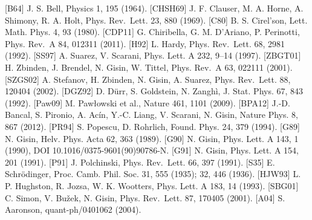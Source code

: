 \documentclass[
  11pt]{article}
\begin{document}
{[}B64{]} J. S. Bell, Physics 1, 195 (1964). {[}CHSH69{]} J. F. Clauser,
M. A. Horne, A. Shimony, R. A. Holt, Phys. Rev.~Lett. 23, 880 (1969).
{[}C80{]} B. S. Cirel'son, Lett. Math. Phys. 4, 93 (1980). {[}CDP11{]}
G. Chiribella, G. M. D'Ariano, P. Perinotti, Phys. Rev.~A 84, 012311
(2011). {[}H92{]} L. Hardy, Phys. Rev.~Lett. 68, 2981 (1992). {[}SS97{]}
A. Suarez, V. Scarani, Phys. Lett. A 232, 9--14 (1997). {[}ZBGT01{]} H.
Zbinden, J. Brendel, N. Gisin, W. Tittel, Phys. Rev.~A 63, 022111
(2001). {[}SZGS02{]} A. Stefanov, H. Zbinden, N. Gisin, A. Suarez, Phys.
Rev.~Lett. 88, 120404 (2002). {[}DGZ92{]} D. Dürr, S. Goldstein, N.
Zanghì, J. Stat. Phys. 67, 843 (1992). {[}Paw09{]} M. Pawłowski et al.,
Nature 461, 1101 (2009). {[}BPA12{]} J.-D. Bancal, S. Pironio, A. Acín,
Y.-C. Liang, V. Scarani, N. Gisin, Nature Phys. 8, 867 (2012).
{[}PR94{]} S. Popescu, D. Rohrlich, Found. Phys. 24, 379 (1994).
{[}G89{]} N. Gisin, Helv. Phys. Acta 62, 363 (1989). {[}G90{]} N. Gisin,
Phys. Lett. A 143, 1 (1990), DOI 10.1016/0375-9601(90)90786-N. {[}G91{]}
N. Gisin, Phys. Lett. A 154, 201 (1991). {[}P91{]} J. Polchinski, Phys.
Rev.~Lett. 66, 397 (1991). {[}S35{]} E. Schrödinger, Proc. Camb. Phil.
Soc. 31, 555 (1935); 32, 446 (1936). {[}HJW93{]} L. P. Hughston, R.
Jozsa, W. K. Wootters, Phys. Lett. A 183, 14 (1993). {[}SBG01{]} C.
Simon, V. Bužek, N. Gisin, Phys. Rev.~Lett. 87, 170405 (2001). {[}A04{]}
S. Aaronson, quant-ph/0401062 (2004).
\end{document}
